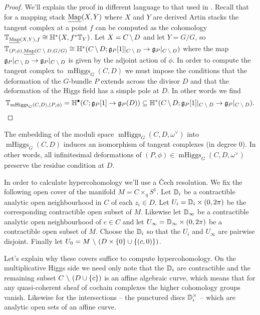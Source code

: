 \documentclass[10pt, oneside]{article}
\DeclareMathOperator{\mhiggs}{mHiggs}
\newcommand{\map}{\ul{\mr{Map}}}
\begin{document}
\begin{proof}
We'll explain the proof in different language to that used in \cite{Bottacin}.  Recall that for a mapping stack $\map(X,Y)$ where $X$ and $Y$ are derived Artin stacks the tangent complex at a point $f$ can be computed as the cohomology $\bb T_{\map(X,Y),f} \iso \bb H^*(X, f^*\bb T_Y)$.  Let $X = C \!\ \backslash \ \! D$ and let $Y = G/G$, so $\bb T_{(P,\phi), \map(C \!\bs\! D, G/G)} \iso \bb H^*(C \!\bs\! D; \gg_P[1]|_{C \!\bs\! D} \to \gg_P|_{C \!\bs\! D})$ where the map $\mathfrak{g}_P|_{C \!\ \backslash \ \! D} \to \mathfrak{g}_P|_{C \!\ \backslash \ \! D}$ is given by the adjoint action of $\phi$.  In order to compute the tangent complex to $\mhiggs_G(C,D)$ we must impose the conditions that the deformation of the $G$-bundle $P$ extends across the divisor $D$ and that the deformation of the Higgs field has a simple pole at $D$.  In other words we find
\[ \bb T_{\mhiggs_G(C,D), (P,\phi)} = \bb H^\bullet(C; \gg_P[1] \to \gg_P(D)) \sub \bb H^*(C \!\bs\! D; \gg_P[1]|_{C \!\bs\! D} \to \gg_P|_{C \!\bs\! D}).\]
\end{proof}

\begin{remark}
The embedding of the moduli space $\mhiggs_G(C, D,\omega^\vee)$ into $\mhiggs_G(C, D)$ induces an isomorphism of tangent complexes (in degree 0).  In other words, all infinitesimal deformations of $(P,\phi) \in \mhiggs_G(C, D,\omega^\vee)$ preserve the residue condition at $D$.
\end{remark}

In order to calculate hypercohomology we'll use a \v Cech resolution.  We fix the following open cover of the manifold $M = C \times_q S^1$.  Let $\mathbb{D}_i$ be a contractible analytic open neighbourhood in $C$ of each $z_i \in D$.  Let $U_i = \mathbb{D}_i \times (0,2\pi)$ be the corresponding contractible open subset of $M$.  Likewise let $\mathbb{D}_\infty$ be a contractible analytic open neighbourhood of $c \in C$ and let $U_\infty = \mathbb{D}_\infty \times (0,2\pi)$ be a contractible open subset of $M$.  Choose the $\mathbb{D}_i$ so that the $U_i$ and $U_\infty$ are pairwise disjoint.  Finally let $U_0 = M \ \backslash \  (D \times \{0\} \cup \{(c,0)\})$.

Let's explain why these covers suffice to compute hypercohomology.  On the multiplicative Higgs side we need only note that the $\mathbb{D}_i$ are contractible and the remaining subset $C \ \backslash \  (D \cup \{c\})$ is an affine algebraic curve, which means that for any quasi-coherent sheaf of cochain complexes the higher cohomology groups vanish.  Likewise for the intersections -- the punctured discs $\mathbb{D}_i^\times$ -- which are analytic open sets of an affine curve.
\end{document}
